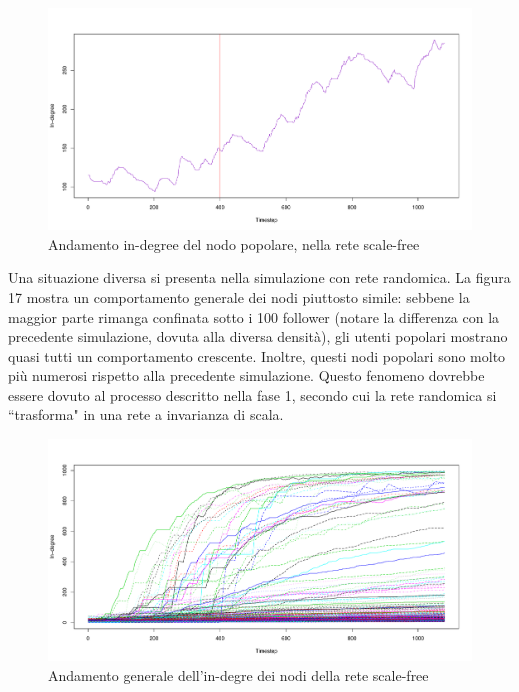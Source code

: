 \documentclass[a4paper,12pt]{article}
\begin{document}
\begin{figure}[H]
\centering
\includegraphics[scale=0.5]{images/gasparri_1000_sf_1080_1.pdf}
\caption{Andamento in-degree del nodo popolare, nella rete scale-free}
\end{figure}
Una situazione diversa si presenta nella simulazione con rete randomica. La figura 17 mostra un comportamento generale dei nodi piuttosto simile: sebbene la maggior parte rimanga confinata sotto i 100 follower (notare la differenza con la precedente simulazione, dovuta alla diversa densità), gli utenti popolari mostrano quasi tutti un comportamento crescente. Inoltre, questi nodi popolari sono molto più numerosi rispetto alla precedente simulazione. Questo fenomeno dovrebbe essere dovuto al processo descritto nella fase 1, secondo cui la rete randomica si ``trasforma" in una rete a invarianza di scala.
\begin{figure}[H]
\centering
\includegraphics[scale=0.5]{images/totale_1000_rnd_1080_1_1.pdf}
\caption{Andamento generale dell'in-degre dei nodi della rete scale-free}
\end{figure}
\end{document}
